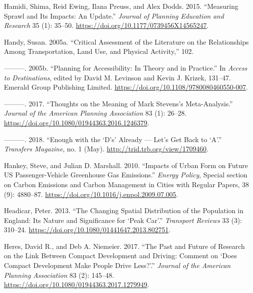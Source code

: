 \documentclass[
  12pt,
]{article}
\newlength{\cslhangindent}
\newlength{\cslentryspacingunit} %
\newenvironment{CSLReferences}[2] %
 {%
  \setlength{\parindent}{0pt}
  \ifodd #1
  \let\oldpar\par
  \def\par{\hangindent=\cslhangindent\oldpar}
  \fi
  \setlength{\parskip}{#2\cslentryspacingunit}
 }%
 {}
\begin{document}
\begin{CSLReferences}{1}{0}
\leavevmode{}%
Hamidi, Shima, Reid Ewing, Ilana Preuss, and Alex Dodds. 2015. {``Measuring {Sprawl} and {Its Impacts}: {An Update}.''} \emph{Journal of Planning Education and Research} 35 (1): 35--50. \url{https://doi.org/10.1177/0739456X14565247}.

\leavevmode{}%
Handy, Susan. 2005a. {``Critical {Assessment} of the {Literature} on the {Relationships Among Transportation}, {Land Use}, and {Physical Activity},''} 102.

\leavevmode{}%
---------. 2005b. {``Planning for {Accessibility}: {In Theory} and in {Practice}.''} In \emph{Access to {Destinations}}, edited by David M. Levinson and Kevin J. Krizek, 131--47. {Emerald Group Publishing Limited}. \url{https://doi.org/10.1108/9780080460550-007}.

\leavevmode{}%
---------. 2017. {``Thoughts on the {Meaning} of {Mark Stevens}'s {Meta-Analysis}.''} \emph{Journal of the American Planning Association} 83 (1): 26--28. \url{https://doi.org/10.1080/01944363.2016.1246379}.

\leavevmode{}%
---------. 2018. {``Enough with the {`{D}'s'} {Already} --- {Let}'s {Get Back} to {`{A}'}.''} \emph{Transfers Magazine}, no. 1 (May). \url{http://trid.trb.org/view/1709460}.

\leavevmode{}%
Hankey, Steve, and Julian D. Marshall. 2010. {``Impacts of Urban Form on Future {US} Passenger-Vehicle Greenhouse Gas Emissions.''} \emph{Energy Policy}, Special {section} on {Carbon Emissions} and {Carbon Management} in {Cities} with {Regular Papers}, 38 (9): 4880--87. \url{https://doi.org/10.1016/j.enpol.2009.07.005}.

\leavevmode{}%
Headicar, Peter. 2013. {``The {Changing Spatial Distribution} of the {Population} in {England}: {Its Nature} and {Significance} for {`{Peak Car}'}.''} \emph{Transport Reviews} 33 (3): 310--24. \url{https://doi.org/10.1080/01441647.2013.802751}.

\leavevmode{}%
Heres, David R., and Deb A. Niemeier. 2017. {``The {Past} and {Future} of {Research} on the {Link Between Compact Development} and {Driving}: {Comment} on {`{Does Compact Development Make People Drive Less}?'}.''} \emph{Journal of the American Planning Association} 83 (2): 145--48. \url{https://doi.org/10.1080/01944363.2017.1279949}.


\end{CSLReferences}
\end{document}

